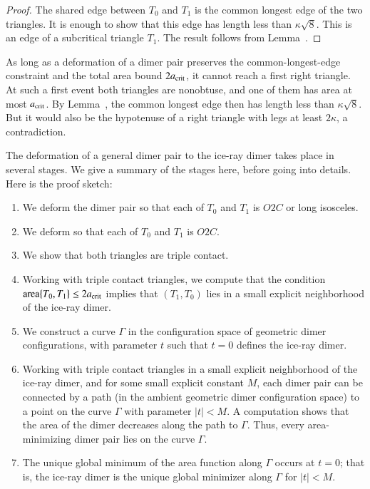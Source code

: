 \begin{proof}  
  The shared edge between $T_0$ and $T_1$ is the common longest edge
  of the two triangles.  It is enough to show that this edge has
  length less than $\kappa\sqrt8$.  This is an edge of a subcritical
  triangle $T_1$. The result follows from Lemma~.
\end{proof}

As long as a deformation of a dimer pair preserves the common-longest-edge
constraint and the total area bound $2a_\text{crit}$, it cannot reach a
first right triangle.  At such a first event both triangles are
nonobtuse, and one of them has area at most $a_\text{crit}$.  By
Lemma~, the common longest edge then has length
less than $\kappa\sqrt8$.  But it would also be the hypotenuse of
a right triangle with legs at least $2\kappa$, a contradiction.

The deformation of a general dimer pair to the ice-ray dimer takes
place in several stages.  We give a summary of the stages here, before
going into details.  Here is the proof sketch:

\begin{enumerate}
\item We deform the dimer pair so that each of $T_0$ and $T_1$ is
  $O2C$ or long isosceles.
\item We deform so that each of $T_0$ and $T_1$ is $O2C$.
\item We show that both triangles are triple contact.
\item Working with triple contact triangles, we compute that the
  condition ${\operatorname{area}}\{T_0,T_1\}\le 2a_\text{crit}$ implies that $(T_1,T_0)$
  lies in a small explicit neighborhood of the ice-ray dimer.
\item We construct a curve $\Gamma$ in the configuration space of
  geometric dimer configurations, with parameter $t$ such that $t=0$ defines the ice-ray
  dimer.
\item Working with triple contact triangles in a small explicit
  neighborhood of the ice-ray dimer, and for some small explicit
  constant $M$, each dimer pair can be connected by a path (in the
  ambient geometric dimer configuration space) to a point on the curve $\Gamma$ with
  parameter $|t|<M$.  A computation shows that the area of the dimer
  decreases along the path to $\Gamma$.  Thus, every area-minimizing
  dimer pair lies on the curve $\Gamma$.
\item The unique global minimum of the area function along $\Gamma$
  occurs at $t=0$; that is, the ice-ray dimer is the unique global
  minimizer along $\Gamma$ for $|t|<M$.
\end{enumerate}

